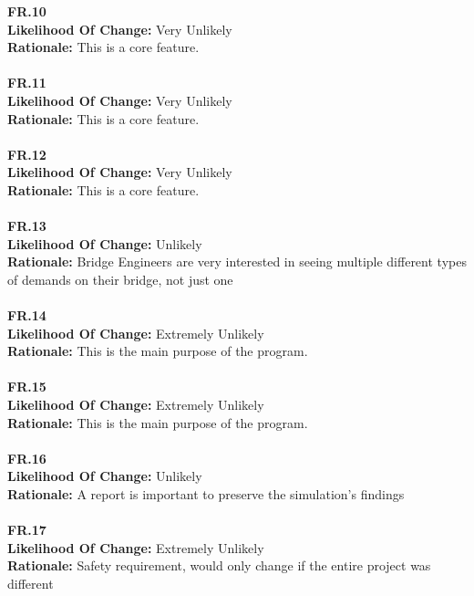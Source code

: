 \documentclass[12pt]{article}
\begin{document}
  \noindent \textbf{FR.10}\\  
  \textbf{Likelihood Of Change:} Very Unlikely\\ 
  \textbf{Rationale:} This is a core feature.\\\\

  \noindent \textbf{FR.11}\\  
  \textbf{Likelihood Of Change:} Very Unlikely\\ 
  \textbf{Rationale:} This is a core feature.\\\\

  \noindent \textbf{FR.12}\\  
  \textbf{Likelihood Of Change:} Very Unlikely\\ 
  \textbf{Rationale:} This is a core feature.\\\\

  \noindent \textbf{FR.13}\\  
  \textbf{Likelihood Of Change:} Unlikely\\ 
  \textbf{Rationale:} Bridge Engineers are very interested in seeing multiple different types of demands on their bridge, not just one\\\\

  \noindent \textbf{FR.14}\\  
  \textbf{Likelihood Of Change:} Extremely Unlikely\\ 
  \textbf{Rationale:} This is the main purpose of the program.\\\\

  \noindent \textbf{FR.15}\\  
  \textbf{Likelihood Of Change:} Extremely Unlikely\\ 
  \textbf{Rationale:} This is the main purpose of the program.\\\\
  
  \noindent \textbf{FR.16}\\  
  \textbf{Likelihood Of Change:} Unlikely\\ 
  \textbf{Rationale:} A report is important to preserve the simulation's findings\\\\

  \noindent \textbf{FR.17}\\  
  \textbf{Likelihood Of Change:} Extremely Unlikely\\ 
  \textbf{Rationale:} Safety requirement, would only change if the entire project was different\\\\
\end{document}
